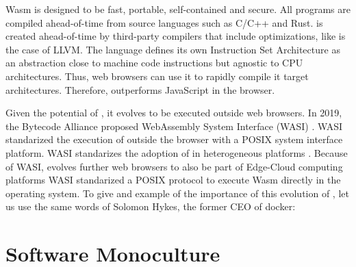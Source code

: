 Wasm is designed to be fast, portable, self-contained and secure.
All \wasm programs are compiled ahead-of-time from source languages such as C/C++ and Rust.
\wasm is created ahead-of-time by third-party compilers that include optimizations, like is the case of LLVM.  
The \wasm language defines its own Instruction Set Architecture \cite{wasm_spec} as an abstraction close to machine code instructions but agnostic to CPU architectures. Thus,  web browsers can use it to rapidly compile it target architectures. Therefore, \wasm outperforms JavaScript in the browser.


Given the potential of \wasm, it evolves to be executed outside web browsers.
In 2019, the Bytecode Alliance \cite{bytecodealliance} proposed WebAssembly System Interface (WASI) \cite{WASI}. 
WASI standarized the execution of \wasm outside the browser with a POSIX system interface platform.
WASI standarizes the adoption of \wasm in heterogeneous platforms \cite{bryant2020webassembly}. 
Because of WASI, \wasm evolves further web browsers to also be part of Edge-Cloud computing platforms \cite{9640153, wen2020wasmachine}
WASI standarized a POSIX protocol to execute Wasm directly in the operating system. 
To give and example of the importance of this evolution of \wasm, let us use the same words of Solomon Hykes, the former CEO of docker: 

\vspace{0.5cm}

\begin{minipage}{0.8\linewidth}
\end{minipage}

\section{Software Monoculture}

